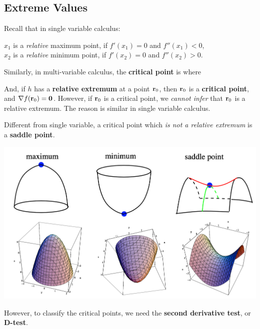 
\begin{spacing}{1.3}

    \section{Extreme Values}
    {\blue Recall that in single variable calculus:

    $x_1$ is a {\it relative} maximum point, if $f'(x_1)=0$ and $f''(x_1)<0$,\\
    $x_2$ is a {\it relative} minimum point, if $f'(x_2)=0$ and $f''(x_2)>0$.
    }

    Similarly, in multi-variable calculus, the {\bf critical point} is where 
    \begin{center}
    \end{center}
    

    And, if $h$ has a {\bf relative extremum} at a point ${\bf r}_0$, then ${\bf r}_0$ is a {\bf critical point},
    and $\nabla f({\bf r}_0)={\bf 0}$.
    However, if ${\bf r}_0$ is a critical point, we {\it cannot infer} that ${\bf r}_0$ is a relative extremum.
    The reason is similar in single variable calculus.

    \vspace{0.4in}
    Different from single variable, a critical point which {\it is not a relative extremum} is a {\bf saddle point}.
    
    \newpage
    \begin{center}
        \includegraphics[scale=0.4]{images/Ch13-saddle.png}
    \end{center}

    However, to classify the critical points, we need the {\bf second derivative test}, or {\bf D-test}.


\end{spacing}
